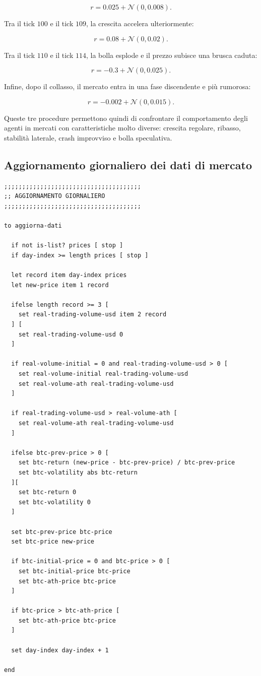 \[
r = 0.025 + \mathcal{N}(0,0.008).
\]

Tra il tick \(100\) e il tick \(109\), la crescita accelera ulteriormente:

\[
r = 0.08 + \mathcal{N}(0,0.02).
\]

Tra il tick \(110\) e il tick \(114\), la bolla esplode e il prezzo subisce una
brusca caduta:

\[
r = -0.3 + \mathcal{N}(0,0.025).
\]

Infine, dopo il collasso, il mercato entra in una fase discendente e più
rumorosa:

\[
r = -0.002 + \mathcal{N}(0,0.015).
\]

Queste tre procedure permettono quindi di confrontare il comportamento degli
agenti in mercati con caratteristiche molto diverse: crescita regolare, ribasso,
stabilità laterale, crash improvviso e bolla speculativa.

\subsection{Aggiornamento giornaliero dei dati di mercato}

\begin{lstlisting}[caption={Procedura di aggiornamento giornaliero dei prezzi e dei volumi reali}]
;;;;;;;;;;;;;;;;;;;;;;;;;;;;;;;;;;;;;;
;; AGGIORNAMENTO GIORNALIERO
;;;;;;;;;;;;;;;;;;;;;;;;;;;;;;;;;;;;;;

to aggiorna-dati

  if not is-list? prices [ stop ]
  if day-index >= length prices [ stop ]

  let record item day-index prices
  let new-price item 1 record

  ifelse length record >= 3 [
    set real-trading-volume-usd item 2 record
  ] [
    set real-trading-volume-usd 0
  ]

  if real-volume-initial = 0 and real-trading-volume-usd > 0 [
    set real-volume-initial real-trading-volume-usd
    set real-volume-ath real-trading-volume-usd
  ]

  if real-trading-volume-usd > real-volume-ath [
    set real-volume-ath real-trading-volume-usd
  ]

  ifelse btc-prev-price > 0 [
    set btc-return (new-price - btc-prev-price) / btc-prev-price
    set btc-volatility abs btc-return
  ][
    set btc-return 0
    set btc-volatility 0
  ]

  set btc-prev-price btc-price
  set btc-price new-price

  if btc-initial-price = 0 and btc-price > 0 [
    set btc-initial-price btc-price
    set btc-ath-price btc-price
  ]

  if btc-price > btc-ath-price [
    set btc-ath-price btc-price
  ]

  set day-index day-index + 1

end
\end{lstlisting}


